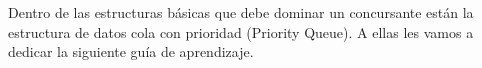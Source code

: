 Dentro de las estructuras básicas que debe dominar un concursante están la estructura de
datos cola con prioridad (Priority Queue). A ellas les vamos a dedicar la siguiente guía de aprendizaje.